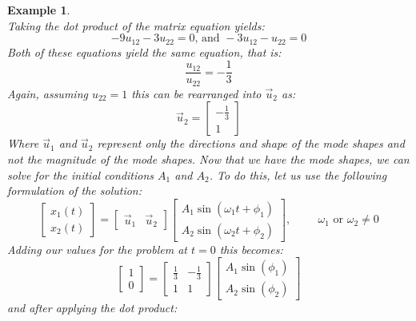 \documentclass[12pt,letter]{article}
\newtheorem{ex}{Example}
\numberwithin{ex}{section} %
\newenvironment{example}{\begin{mdframed}[middlelinewidth=0.5mm]\begin{ex}\normalfont}{\end{ex}\end{mdframed}}
\numberwithin{re}{section} %
\begin{document}
\begin{example}
\begin{equation}
\end{equation}
Taking the dot product of the matrix equation yields:
\begin{equation}
	-9u_{12} -3u_{22}=0 \text{, and } -3u_{12} - u_{22}=0
\end{equation}
Both of these equations yield the same equation, that is:
\begin{equation}
	\frac{u_{12}}{u_{22}} =-\frac{1}{3}
\end{equation}
Again, assuming $u_{22}=1$  this can be rearranged into $\vec{u}_2$ as:
\begin{equation}
	 \vec{u}_2 = \begin{bmatrix} -\frac{1}{3}\\ 1\end{bmatrix}
\end{equation}
Where $\vec{u}_1$ and $\vec{u}_2$ represent only the directions and shape of the mode shapes and not the magnitude of the mode shapes. 
Now that we have the mode shapes, we can solve for the initial conditions $A_1$ and $A_2$. To do this, let us use the following formulation of the solution:
\begin{equation}
	 \begin{bmatrix} x_1(t) \\  x_2(t) \end{bmatrix} =  \begin{bmatrix} \vec{u}_1 & \vec{u}_2 \end{bmatrix}
	 \begin{bmatrix} A_1 \sin (\omega_1 t + \phi_1 )\\ A_2 \sin (\omega_2 t + \phi_2 )\end{bmatrix}, \hspace{1cm} \omega_1 \text{ or } \omega_2 \neq 0
\end{equation}
Adding our values for the problem at $t=0$ this becomes:
\begin{equation}
	 \begin{bmatrix} 1 \\  0 \end{bmatrix} =  \begin{bmatrix} \frac{1}{3} & -\frac{1}{3} \\ 1 & 1 \end{bmatrix}
	 \begin{bmatrix} A_1 \sin (\phi_1)\\ A_2 \sin (\phi_2)\end{bmatrix}
\end{equation}
and after applying the dot product:

\end{example}
\end{document}
